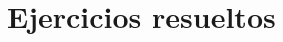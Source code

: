 \clearpage
\newpage

\section{Ejercicios resueltos}
\begin{enumerate}[leftmargin=*]
% 
% 

\end{enumerate}
